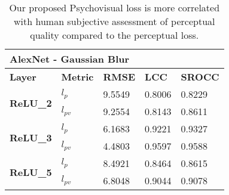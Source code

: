 \documentclass[10pt,twocolumn,letterpaper]{article}
\begin{document}
\begin{table}[]
\caption{Our proposed Psychovisual loss is more correlated with human subjective assessment of perceptual quality compared to the perceptual loss.}
\begin{tabular}{|l|l|l|l|l|}
\hline
\multicolumn{5}{|l|}{\textbf{AlexNet - Gaussian Blur}}                                              \\ \hline
\textbf{Layer}                    & \textbf{Metric} & \textbf{RMSE} & \textbf{LCC} & \textbf{SROCC} \\ \hline
\multirow{2}{*}{\textbf{ReLU\_2}} &\textbf{$l_{p}$}              & 9.5549        & 0.8006       & 0.8229         \\ \cline{2-5} 
                                  & \textbf{$l_{pv}$}             & 9.2554        & 0.8143       & 0.8611         \\ \hline
\multirow{2}{*}{\textbf{ReLU\_3}} & \textbf{$l_{p}$}              & 6.1683        & 0.9221       & 0.9327         \\ \cline{2-5} 
                                  & \textbf{$l_{pv}$}             & 4.4803        & 0.9597       & 0.9588         \\ \hline
\multirow{2}{*}{\textbf{ReLU\_5}} & \textbf{$l_{p}$}              & 8.4921        & 0.8464       & 0.8615         \\ \cline{2-5} 
                                  & \textbf{$l_{pv}$}             & 6.8048        & 0.9044       & 0.9078         \\ \hline
\end{tabular}
\end{table}
\end{document}
